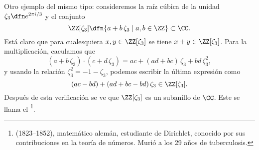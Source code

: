 \begin{ejemplo}
  \label{ejemplo:enteros-de-eisenstein}
  Otro ejemplo del mismo tipo: consideremos la raíz cúbica de la unidad
  $\zeta_3 \dfn e^{2\pi i/3}$ y el conjunto
  $$\ZZ [\zeta_3] \dfn \{ a + b\,\zeta_3 \mid a,b \in \ZZ \} \subset \CC.$$
  Está claro que para cualesquiera $x,y \in \ZZ [\zeta_3]$ se tiene
  $x+y \in \ZZ [\zeta_3]$. Para la multiplicación, caculamos que
  $$(a + b\,\zeta_3)\cdot (c + d\,\zeta_3) = ac + (ad + bc)\,\zeta_3 + bd\,\zeta_3^2,$$
  y usando la relación $\zeta_3^2 = -1 - \zeta_3$, podemos escribir la última
  expresión como
  $$(ac - bd) + (ad + bc - bd)\,\zeta_3 \in \ZZ [\zeta_3].$$
  Después de esta verificación se ve que $\ZZ [\zeta_3]$ es un subanillo de
  $\CC$. Este se llama el \footnote{
    (1823--1852), matemático alemán, estudiante de Dirichlet, conocido por sus
    contribuciones en la teoría de números. Murió a los 29 años de
    tuberculosis.}.
\end{ejemplo}

